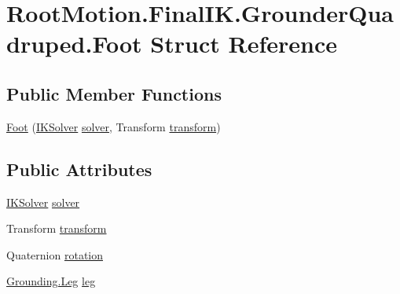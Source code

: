 \hypertarget{struct_root_motion_1_1_final_i_k_1_1_grounder_quadruped_1_1_foot}{}\section{Root\+Motion.\+Final\+I\+K.\+Grounder\+Quadruped.\+Foot Struct Reference}
\label{struct_root_motion_1_1_final_i_k_1_1_grounder_quadruped_1_1_foot}
\subsection*{Public Member Functions}
\begin{DoxyCompactItemize}
\item 
\mbox{\hyperlink{struct_root_motion_1_1_final_i_k_1_1_grounder_quadruped_1_1_foot_ae7c548b819bd83b227523e0e1095e377}{Foot}} (\mbox{\hyperlink{class_root_motion_1_1_final_i_k_1_1_i_k_solver}{I\+K\+Solver}} \mbox{\hyperlink{struct_root_motion_1_1_final_i_k_1_1_grounder_quadruped_1_1_foot_a9d8dffc779b480bab15c63aef7681d6b}{solver}}, Transform \mbox{\hyperlink{struct_root_motion_1_1_final_i_k_1_1_grounder_quadruped_1_1_foot_ad5f539c65904358a36b45ca8fe512478}{transform}})
\end{DoxyCompactItemize}
\subsection*{Public Attributes}
\begin{DoxyCompactItemize}
\item 
\mbox{\hyperlink{class_root_motion_1_1_final_i_k_1_1_i_k_solver}{I\+K\+Solver}} \mbox{\hyperlink{struct_root_motion_1_1_final_i_k_1_1_grounder_quadruped_1_1_foot_a9d8dffc779b480bab15c63aef7681d6b}{solver}}
\item 
Transform \mbox{\hyperlink{struct_root_motion_1_1_final_i_k_1_1_grounder_quadruped_1_1_foot_ad5f539c65904358a36b45ca8fe512478}{transform}}
\item 
Quaternion \mbox{\hyperlink{struct_root_motion_1_1_final_i_k_1_1_grounder_quadruped_1_1_foot_a726fc22cfd9b2b7a31ec44fc4f91b21f}{rotation}}
\item 
\mbox{\hyperlink{class_root_motion_1_1_final_i_k_1_1_grounding_1_1_leg}{Grounding.\+Leg}} \mbox{\hyperlink{struct_root_motion_1_1_final_i_k_1_1_grounder_quadruped_1_1_foot_a5bffd0a18043ddf14d9ec81a7b449dd6}{leg}}
\end{DoxyCompactItemize}


